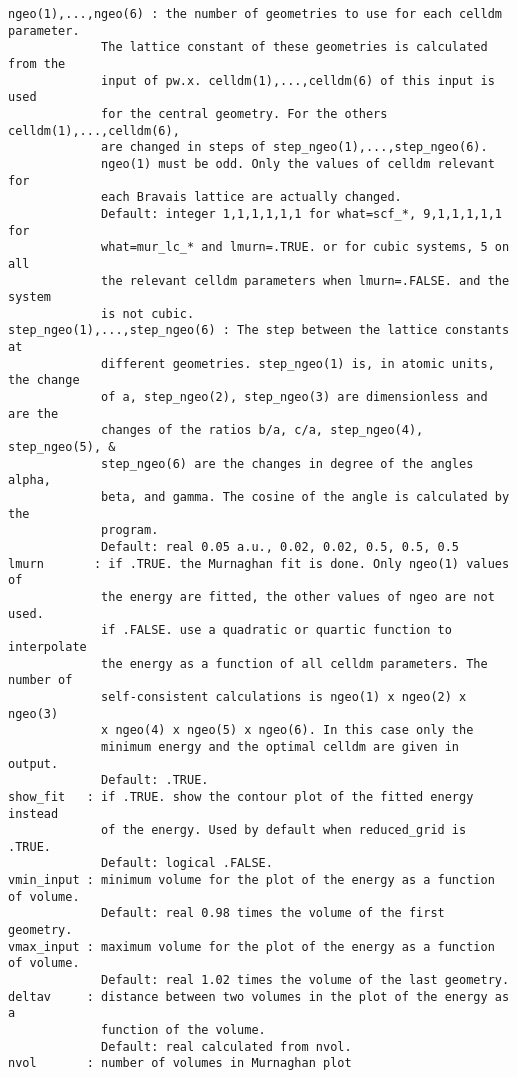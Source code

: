 \documentclass[12pt,a4paper]{article}
\begin{document}
\begin{verbatim}
ngeo(1),...,ngeo(6) : the number of geometries to use for each celldm parameter.
             The lattice constant of these geometries is calculated from the
             input of pw.x. celldm(1),...,celldm(6) of this input is used 
             for the central geometry. For the others celldm(1),...,celldm(6),
             are changed in steps of step_ngeo(1),...,step_ngeo(6). 
             ngeo(1) must be odd. Only the values of celldm relevant for
             each Bravais lattice are actually changed.
             Default: integer 1,1,1,1,1,1 for what=scf_*, 9,1,1,1,1,1 for 
             what=mur_lc_* and lmurn=.TRUE. or for cubic systems, 5 on all 
             the relevant celldm parameters when lmurn=.FALSE. and the system
             is not cubic.
step_ngeo(1),...,step_ngeo(6) : The step between the lattice constants at 
             different geometries. step_ngeo(1) is, in atomic units, the change
             of a, step_ngeo(2), step_ngeo(3) are dimensionless and are the
             changes of the ratios b/a, c/a, step_ngeo(4), step_ngeo(5), &
             step_ngeo(6) are the changes in degree of the angles alpha,
             beta, and gamma. The cosine of the angle is calculated by the
             program.
             Default: real 0.05 a.u., 0.02, 0.02, 0.5, 0.5, 0.5
lmurn       : if .TRUE. the Murnaghan fit is done. Only ngeo(1) values of
             the energy are fitted, the other values of ngeo are not used. 
             if .FALSE. use a quadratic or quartic function to interpolate 
             the energy as a function of all celldm parameters. The number of 
             self-consistent calculations is ngeo(1) x ngeo(2) x ngeo(3)
             x ngeo(4) x ngeo(5) x ngeo(6). In this case only the 
             minimum energy and the optimal celldm are given in output. 
             Default: .TRUE. 
show_fit   : if .TRUE. show the contour plot of the fitted energy instead
             of the energy. Used by default when reduced_grid is .TRUE.
             Default: logical .FALSE.
vmin_input : minimum volume for the plot of the energy as a function of volume.
             Default: real 0.98 times the volume of the first geometry.
vmax_input : maximum volume for the plot of the energy as a function of volume.
             Default: real 1.02 times the volume of the last geometry.
deltav     : distance between two volumes in the plot of the energy as a 
             function of the volume.
             Default: real calculated from nvol.
nvol       : number of volumes in Murnaghan plot

\end{verbatim}
\end{document}
